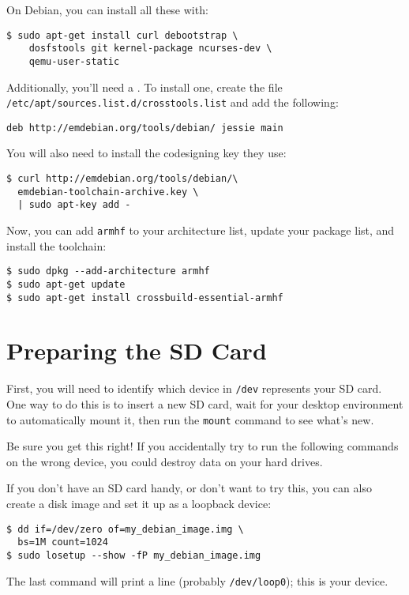 \documentclass{sockitguide}
\begin{document}
On Debian, you can install all these with:
\begin{verbatim}
$ sudo apt-get install curl debootstrap \
    dosfstools git kernel-package ncurses-dev \
    qemu-user-static
\end{verbatim}

Additionally, you'll need a . To install one, create the
file \texttt{/etc/apt/sources.list.d/crosstools.list} and add the
following:
\begin{verbatim}
deb http://emdebian.org/tools/debian/ jessie main
\end{verbatim}

You will also need to install the codesigning key they use:
\begin{verbatim}
$ curl http://emdebian.org/tools/debian/\
  emdebian-toolchain-archive.key \
  | sudo apt-key add -
\end{verbatim}

Now, you can add \texttt{armhf} to your architecture list, update your package list, and install the toolchain:
\begin{verbatim}
$ sudo dpkg --add-architecture armhf
$ sudo apt-get update
$ sudo apt-get install crossbuild-essential-armhf
\end{verbatim}

\section{Preparing the SD Card}

First, you will need to identify which device in \texttt{/dev}
represents your SD card. One way to do this is to insert a new SD
card, wait for your desktop environment to automatically mount it,
then run the \texttt{mount} command to see what's new.

Be sure you get this right! If you accidentally try to run the following
commands on the wrong device, you could destroy data on your hard
drives.

If you don't have an SD card handy, or don't want to try this, you can
also create a disk image and set it up as a loopback device:
\begin{verbatim}
$ dd if=/dev/zero of=my_debian_image.img \
  bs=1M count=1024
$ sudo losetup --show -fP my_debian_image.img
\end{verbatim}

The last command will print a line (probably \texttt{/dev/loop0});
this is your device.
\end{document}
